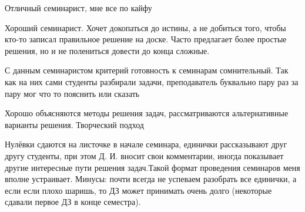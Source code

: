             \begin{commentbox} 
                Отличный семинарист, мне все по кайфу 
            \end{commentbox} 
        
            \begin{commentbox} 
                Хороший семинарист. Хочет докопаться до истины, а не добиться того, чтобы кто-то записал правильное решение на доске. Часто предлагает более простые решения, но и не полениться довести  до конца сложные. 
            \end{commentbox} 
        
            \begin{commentbox} 
                С данным семинаристом критерий готовность к семинарам сомнительный. Так как на них сами студенты разбирали задачи, преподаватель буквально пару раз за пару мог что то пояснить или сказать 
            \end{commentbox} 
        
            \begin{commentbox} 
                Хорошо объясняются методы решения задач, рассматриваются альтернативные варианты решения. Творческий подход 
            \end{commentbox} 
        
            \begin{commentbox} 
                Нулёвки сдаются на листочке в начале семинара, единички рассказывают друг другу студенты, при этом Д. И. вносит свои комментарии, иногда показывает другие интересные пути решения задач.Такой формат проведения семинаров меня вполне устраивает. Минусы: почти всегда не успеваем разобрать все единички, а если если плохо шаришь, то ДЗ может принимать очень долго (некоторые сдавали первое ДЗ в конце семестра).   
            \end{commentbox}
    
    
